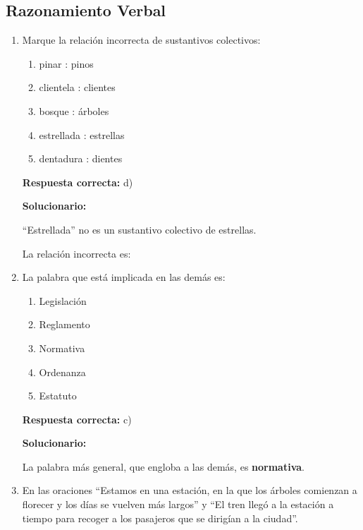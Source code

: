 \subsection*{Razonamiento Verbal}

\begin{enumerate}[resume]
	
	\item Marque la relación incorrecta de sustantivos colectivos:
	\begin{enumerate}[label=\alph*)]
		\item pinar : pinos
		\item clientela : clientes
		\item bosque : árboles
		\item estrellada : estrellas
		\item dentadura : dientes
	\end{enumerate}
	\textbf{Respuesta correcta:} d)
	
	\vspace{2mm}
	\textbf{Solucionario:}
	
	``Estrellada'' no es un sustantivo colectivo de estrellas.
	
	La relación incorrecta es:
	
	
	\vspace{6mm}
	
	\item La palabra que está implicada en las demás es:
	\begin{enumerate}[label=\alph*)]
		\item Legislación
		\item Reglamento
		\item Normativa
		\item Ordenanza
		\item Estatuto
	\end{enumerate}
	\textbf{Respuesta correcta:} c)
	
	\vspace{2mm}
	\textbf{Solucionario:}
	
	La palabra más general, que engloba a las demás, es \textbf{normativa}.
	
	\vspace{6mm}
	
	\item En las oraciones ``Estamos en una estación, en la que los árboles comienzan a florecer y los días se vuelven más largos'' y ``El tren llegó a la estación a tiempo para recoger a los pasajeros que se dirigían a la ciudad''.
	

\end{enumerate}
